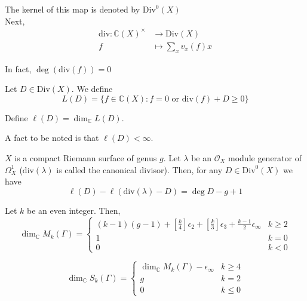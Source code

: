 \documentclass[oneside, 12pt]{scrbook}
\newcommand{\CC}{\mathbb C}
\theoremstyle{theorem}
\begin{document}
The kernel of this map is denoted by $\mathrm{Div}^{0}(X)$ \\

Next, 
\begin{eqnarray}
\mathrm{div} : \CC(X)^{\times} &\longrightarrow \mathrm{Div}(X) \\
f &\mapsto \sum_{x} v_{x}(f) x
\end{eqnarray}

\begin{exercise}
In fact, $\deg(\mathrm{div}(f))=0$
\end{exercise}

Let $D\in \mathrm{Div}(X)$. We define \begin{equation}
L(D) = \{f \in \CC(X): f=0 \text{ or } \mathrm{div}(f) + D \geq 0\}
\end{equation}

Define $\ell (D) = \dim_{\CC} L (D)$. 

\begin{remark}
A fact to be noted is that $\ell (D) < \infty$.
\end{remark}

\begin{theorem}
$X$ is a compact Riemann surface of genus $g$. Let $\lambda$ be an $\mathcal{O}_{X}$ module generator of $\Omega_{X}^{1}$ ($\mathrm{div}(\lambda)$ is called the canonical divisor). Then, for any $D \in \mathrm{Div}^{0}(X)$ we have 
\begin{equation}
\ell (D)  - \ell(\mathrm{div}(\lambda) - D) = \deg D - g + 1
\end{equation}
\end{theorem}



\begin{theorem}
Let $k$ be an even integer. Then, 
\begin{equation}
\dim_{\CC} M_{k}(\Gamma) = \begin{cases} (k-1)(g-1) + \left[ \frac{k}{4} \right] \epsilon_{2} + \left[ \frac{k}{3} \right] \epsilon_{3} + \frac{k-1}{2} \epsilon_{\infty} & k \geq 2 \\ 1 & k=0 \\ 0 & k<0 \end{cases}
\end{equation}

\begin{equation}
\dim_{\CC}S_{k}(\Gamma) = \begin{cases} \dim_{\CC} M_{k}(\Gamma) - \epsilon_{\infty}  & k \geq 4 \\ g & k =2 \\ 0 & k \le 0 \end{cases}
\end{equation}
\end{theorem}
\end{document}
